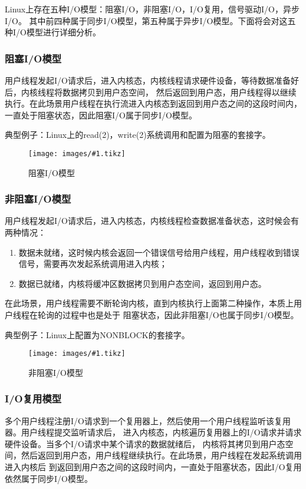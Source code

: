 \documentclass[supercite]{HustGraduPaper}
\newcommand{\cfig}[3]{
  \begin{figure}[htb]
    \centering
    \texttt{[image: images/\#1.tikz]}
    \caption{#3}
    \label{fig:#1}
  \end{figure}
}
\theoremstyle{definition}
\begin{document}
Linux上存在五种I/O模型：阻塞I/O，非阻塞I/O，I/O复用，信号驱动I/O，异步I/O。
其中前四种属于同步I/O模型，第五种属于异步I/O模型。下面将会对这五种I/O模型进行详细分析。\par

\subsubsection{阻塞I/O模型}
用户线程发起I/O请求后，进入内核态，内核线程请求硬件设备，等待数据准备好后，内核线程将数据拷贝到用户态空间，
然后返回到用户态，用户线程得以继续执行。在此场景用户线程在执行流进入内核态到返回到用户态之间的这段时间内，
一直处于阻塞状态，因此阻塞I/O属于同步I/O模型。\par

典型例子：Linux上的read(2)，write(2)系统调用和配置为阻塞的套接字。\par

\cfig{block-io}{0.5}{阻塞I/O模型}

\subsubsection{非阻塞I/O模型}
用户线程发起I/O请求后，进入内核态，内核线程检查数据准备状态，这时候会有两种情况：
\begin{enumerate}
  \item 数据未就绪，这时候内核会返回一个错误信号给用户线程，用户线程收到错误信号，需要再次发起系统调用进入内核；
  \item 数据已就绪，内核将缓冲区数据拷贝到用户态空间，返回到用户态。
\end{enumerate}

在此场景，用户线程需要不断轮询内核，直到内核执行上面第二种操作，本质上用户线程在轮询的过程中也是处于
阻塞状态，因此非阻塞I/O也属于同步I/O模型。\par

典型例子：Linux上配置为NONBLOCK的套接字。\par

\cfig{nonblock-io}{0.5}{非阻塞I/O模型}

\subsubsection{I/O复用模型}
多个用户线程注册I/O请求到一个复用器上，然后使用一个用户线程监听该复用器。用户线程提交监听请求后，
进入内核态，内核遍历复用器上的I/O请求并请求硬件设备。当多个I/O请求中某个请求的数据就绪后，
内核将其拷贝到用户态空间，然后返回到用户态，用户线程继续执行。在此场景，用户线程在发起系统调用进入内核后
到返回到用户态之间的这段时间内，一直处于阻塞状态，因此I/O复用依然属于同步I/O模型。\par
\end{document}
